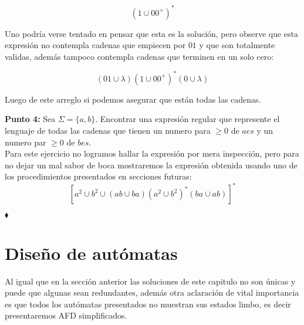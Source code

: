 \begin{itemize}
      $$(1\cup00^+)^*$$

      Uno podría verse tentado en pensar que esta es la solución, pero observe que esta expresión no contempla cadenas que empiecen por $01$ y que son totalmente validas, además tampoco contempla cadenas que terminen en un solo cero:

      $$(01\cup\lambda)(1\cup00^+)^*(0\cup\lambda)$$

      Luego de este arreglo si podemos asegurar que están todas las cadenas.
  
\end{itemize}

\textbf{Punto 4: }Sea $\Sigma=\{a,b\}$. Encontrar una expresión regular que represente el lenguaje de todas las cadenas que tienen un numero para $\geq0$ de $aes$ y un numero par $\geq0$ de $bes.$\\

Para este ejercicio no logramos hallar la expresión por mera inspección, pero para no dejar un mal sabor de boca mostraremos la expresión obtenida usando uno de los procedimientos presentados en secciones futuras:
$$[a^2\cup b^2\cup(ab\cup ba)(a^2\cup b^2)^*(ba\cup ab)]^*$$

\hfill $\blacklozenge$



\section{Diseño de autómatas}


Al igual que en la sección anterior las soluciones de este capitulo no son únicas y puede que algunas sean redundantes, además otra aclaración de vital importancia es que todos los autómatas presentados no muestran sus estados limbo, es decir presentaremos AFD simplificados.\\

